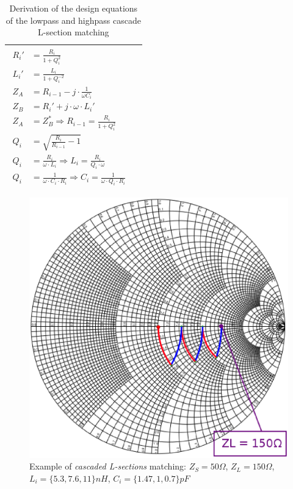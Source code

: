 \begin{table}[H]
\begin{tabular}{ | c | c | }
\begin{minipage}{.4\textwidth}
          {\begin{align}
           R_i' &= \frac{R_i}{1 + Q_i^2} \\
           L_i' &= \frac{L_i}{1 + Q_i^{-2}} \\
           Z_A &= R_{i-1} - j \cdot \frac{1}{\omega C_i} \\
           Z_B &= R_{i}' + j \cdot \omega \cdot L_i' \\
           Z_A &= Z_B^* \Longrightarrow R_{i-1} = \frac{R_i}{1 + Q_i^2} \\
           Q_{i} &= \sqrt{\frac{R_{i}}{R_{i-1}} - 1} \\
           Q_{i} &= \frac{R_{i}}{\omega \cdot L_i} \Longrightarrow L_i = \frac{R_i}{Q_i \cdot \omega}\\
           Q_{i} &= \frac{1}{\omega \cdot C_i \cdot R_{i}} \Longrightarrow C_i = \frac{1}{\omega \cdot Q_i \cdot R_i}
         \end{align}}
    \end{minipage}
    \\ \hline
  \end{tabular}
  \caption{Derivation of the design equations of the lowpass and highpass cascade L-section matching}
  \label{tbl:cascaded-l-section-lowpass-highpass}
\end{table}




\begin{figure}[H]
\centering
\includegraphics[width=120mm]{SmithCascadedLCsections}
\caption{Example of \textit{cascaded L-sections} matching: $Z_S = 50\Omega$, $Z_L = 150\Omega$, $L_i = \lbrace 5.3, 7.6, 11\rbrace nH$, $C_i = \lbrace 1.47, 1, 0.7 \rbrace pF$}
\end{figure}


